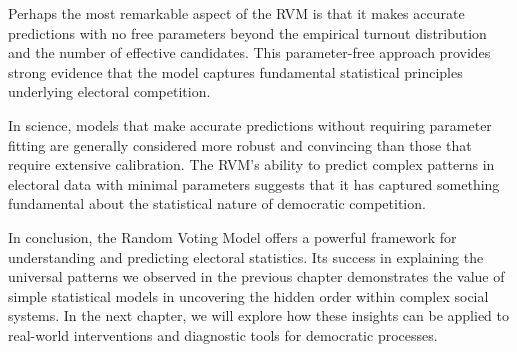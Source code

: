 Perhaps the most remarkable aspect of the RVM is that it makes accurate predictions with no free parameters beyond the empirical turnout distribution and the number of effective candidates. This parameter-free approach provides strong evidence that the model captures fundamental statistical principles underlying electoral competition.

In science, models that make accurate predictions without requiring parameter fitting are generally considered more robust and convincing than those that require extensive calibration. The RVM's ability to predict complex patterns in electoral data with minimal parameters suggests that it has captured something fundamental about the statistical nature of democratic competition.

In conclusion, the Random Voting Model offers a powerful framework for understanding and predicting electoral statistics. Its success in explaining the universal patterns we observed in the previous chapter demonstrates the value of simple statistical models in uncovering the hidden order within complex social systems. In the next chapter, we will explore how these insights can be applied to real-world interventions and diagnostic tools for democratic processes. 